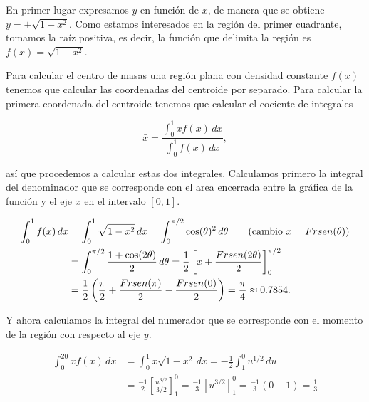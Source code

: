 \documentclass[
  spanish,
  a4paper,
]{scrreport}
\theoremstyle{definition}
\theoremstyle{remark}
\begin{document}
\begin{tcolorbox}[enhanced jigsaw, arc=.35mm, bottomrule=.15mm, bottomtitle=1mm, breakable, colback=white, colbacktitle=quarto-callout-tip-color!10!white, colframe=quarto-callout-tip-color-frame, coltitle=black, left=2mm, leftrule=.75mm, opacityback=0, opacitybacktitle=0.6, rightrule=.15mm, title=\textcolor{quarto-callout-tip-color}{\faLightbulb}\hspace{0.5em}{Solución}, titlerule=0mm, toprule=.15mm, toptitle=1mm]

En primer lugar expresamos \(y\) en función de \(x\), de manera que se
obtiene \(y = \pm\sqrt{1-x^2}\). Como estamos interesados en la región
del primer cuadrante, tomamos la raíz positiva, es decir, la función que
delimita la región es \(f(x)=\sqrt{1-x^2}\).

Para calcular el
\href{https://aprendeconalf.es/analisis-manual/08-integrales.html\#centro-de-masas-de-una-regi\%C3\%B3n-plana-con-densidad-fija}{centro
de masas una región plana con densidad constante} \(f(x)\) tenemos que
calcular las coordenadas del centroide por separado. Para calcular la
primera coordenada del centroide tenemos que calcular el cociente de
integrales

\[
\bar x = \frac{\int_0^1 x f(x)\,dx}{\int_0^1f(x)\,dx}, 
\]

así que procedemos a calcular estas dos integrales. Calculamos primero
la integral del denominador que se corresponde con el area encerrada
entre la gráfica de la función y el eje \(x\) en el intervalo \([0,1]\).

\begin{align*}
\int_0^1 f(x)\,dx 
&= \int_0^1 \sqrt{1-x^2} \,dx
= \int_0^{\pi/2} \cos(\theta)^2\,d\theta  \tag{cambio $x=\operatorname{sen}(\theta)$}\\
&= \int_0^{\pi/2} \frac{1+\cos(2\theta)}{2}\,d\theta
= \frac{1}{2}\left[x+\frac{\operatorname{sen}(2\theta)}{2}\right]_0^{\pi/2} \\
&= \frac{1}{2}\left(\frac{\pi}{2}+\frac{\operatorname{sen}(\pi)}{2}-\frac{\operatorname{sen}(0)}{2}\right)
= \frac{\pi}{4}
\approx 0.7854.
\end{align*}

Y ahora calculamos la integral del numerador que se corresponde con el
momento de la región con respecto al eje \(y\).

\begin{align*}
\int_0^{20} xf(x)\,dx 
&= \int_0^1 x\sqrt{1-x^2} \,dx
= -\frac{1}{2}\int_1^0 u^{1/2}\,du  \tag{cambio $u=1-x^2$} \\
&= \frac{-1}{2}\left[\frac{u^{3/2}}{3/2}\right]_1^0 
= \frac{-1}{3}[u^{3/2}]_1^0 
= \frac{-1}{3}(0-1)
= \frac{1}{3}
\end{align*}


\end{tcolorbox}
\end{document}

